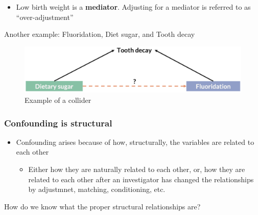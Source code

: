 \documentclass[
]{book}
\providecommand{\tightlist}{%
  \setlength{\itemsep}{0pt}\setlength{\parskip}{0pt}}
\begin{document}
\begin{itemize}
\tightlist
\item
  Low birth weight is a \textbf{mediator}. Adjusting for a mediator is referred to as ``over-adjustment''
\end{itemize}

Another example: Fluoridation, Diet sugar, and Tooth decay

\begin{figure}

{\centering \includegraphics[width=1\linewidth]{img/confounding/overadjusting_example} 

}

\caption{Example of a collider}\label{fig:unnamed-chunk-4}
\end{figure}

\hypertarget{confounding-is-structural}{%
\subsubsection{Confounding is structural}\label{confounding-is-structural}}

\begin{itemize}
\tightlist
\item
  Confounding arises because of how, structurally, the variables are related to each other

  \begin{itemize}
  \tightlist
  \item
    Either how they are naturally related to each other, or, how they are related to each other after an investigator has changed the relationships by adjustmnet, matching, conditioning, etc.
  \end{itemize}
\end{itemize}

How do we know what the proper structural relationships are?
\end{document}
